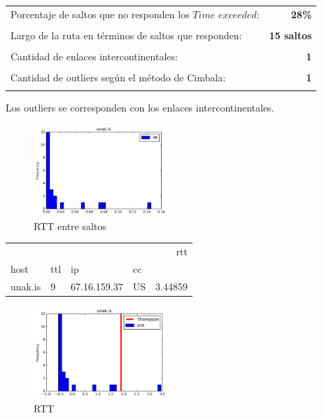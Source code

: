 \begin{center}
\begin{tabular}{p{6.5cm}r}
Porcentaje de saltos que no responden los $Time$ $exceeded$: & \textbf{28\%} \\ \\ 
Largo de la ruta en términos de saltos que responden: &\textbf{15 saltos} \\ \\
Cantidad de enlaces intercontinentales: & \textbf{1} \\ \\
Cantidad de outliers según el método de Cimbala: & \textbf{1} \\ \\
\end{tabular}
\end{center}

Los outliers se corresponden con los enlaces intercontinentales.


\begin{figure}[H]
  \centering
    \includegraphics[width=0.45\textwidth]{histogramas_rtt/unak-is.png}
  \caption{RTT entre saltos}
  \label{entropia-s}
\end{figure}

\begin{center}
\begin{tabular}{llllr}
\toprule
        &    &               &    &      rtt \\
host & ttl & ip & cc &          \\
\midrule
unak.is & 9  & 67.16.159.37 & US &  3.44859 \\
\bottomrule
\end{tabular}
\end{center}

\begin{figure}[H]
  \centering
    \includegraphics[width=0.45\textwidth]{histogramas_thompson/unak-is.png}
  \caption{RTT }
  \label{entropia-s}
\end{figure}

